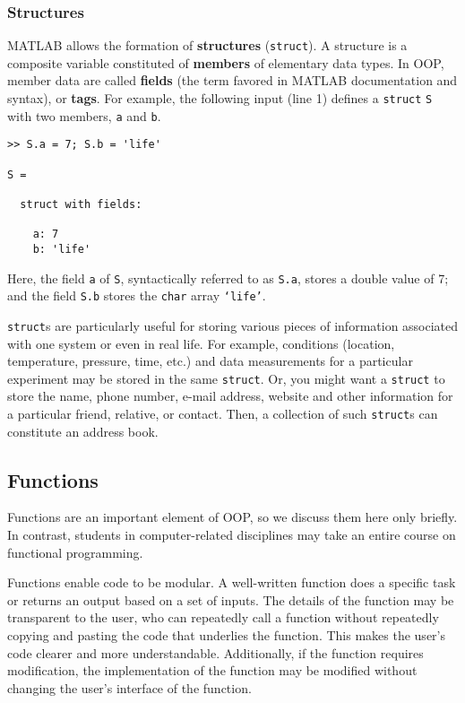 \subsubsection{Structures}
MATLAB allows the formation of \textbf{structures} (\texttt{struct}). A structure is a composite variable constituted of \textbf{members} of elementary data types. In OOP, member data are called \textbf{fields} (the term favored in MATLAB documentation and syntax), or \textbf{tags}. For example, the following input (line 1) defines a \texttt{struct} \texttt{S} with two members, \texttt{a} and \texttt{b}.
\begin{lstlisting}[style=Matlab-editor]
>> S.a = 7; S.b = 'life'

S = 

  struct with fields:

    a: 7
    b: 'life'
\end{lstlisting}
Here, the field \texttt{a} of \texttt{S}, syntactically referred to as \texttt{S.a}, stores a double value of 7; and the field \texttt{S.b} stores the \texttt{char} array \texttt{`life'}.

\texttt{struct}s are particularly useful for storing various pieces of information associated with one system or even in real life. For example, conditions (location, temperature, pressure, time, etc.) and data measurements for a particular experiment may be stored in the same \texttt{struct}. Or, you might want a \texttt{struct} to store the name, phone number, e-mail address, website and other information for a particular friend, relative, or contact. Then, a collection of such \texttt{struct}s can constitute an address book.

\subsection{Functions}
Functions are an important element of OOP, so we discuss them here only briefly. In contrast, students in computer-related disciplines may take an entire course on functional programming.

Functions enable code to be modular. A well-written function does a specific task or returns an output based on a set of inputs. The details of the function may be transparent to the user, who can repeatedly call a function without repeatedly copying and pasting the code that underlies the function. This makes the user's code clearer and more understandable. Additionally, if the function requires modification, the implementation of the function may be modified without changing the user's interface of the function.

